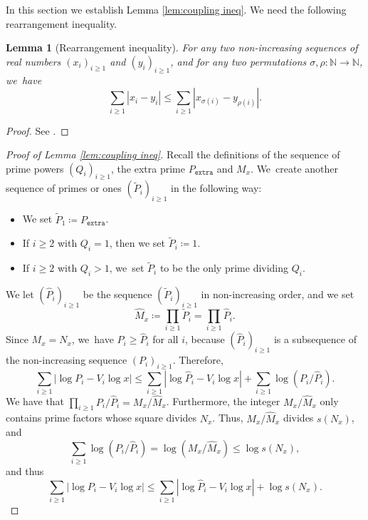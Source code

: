 \documentclass[JEP,XML,SOM,Unicode,published]{cedram}
\newcommand{\NN}{\mathbb{N}}
\newcommand{\pextra}{P_{\mathtt{extra}}}
\theoremstyle{plain}
\newtheorem{lem}[cor]{Lemma}
\theoremstyle{definition}
\begin{document}
In this section we establish Lemma \ref{lem:coupling ineq}.
We need the following rearrangement inequality.

\begin{lem}[Rearrangement inequality]
\label{lem:rearrangement-ineq}
For any two non-increasing sequences of real numbers $(x_i)_{i \ge 1}$ and $(y_i)_{i \ge 1}$, and for any two permutations $\sigma, \rho \colon \NN \to \NN$, we~have
\[
\sum_{i \ge 1} |x_i - y_i| \le \sum_{i \ge 1} |x_{\sigma(i)} - y_{\rho(i)}|.
\]
\end{lem}

\begin{proof} See \cite[Lem.\,3.2]{ABT06}.
\end{proof}

\begin{proof}[Proof of Lemma \ref{lem:coupling ineq}]
Recall the definitions of the sequence of prime powers $(Q_i)_{i \ge 1}$, the extra prime $\pextra$ and $M_x$. We~create another sequence of primes or ones $(\tilde P_i)_{i \ge 1}$ in the following way:
\begin{itemize}
\item We set $\tilde P_1 \coloneqq \pextra$.

\item If $i \ge 2$ with $Q_i = 1$, then we set $\tilde P_i \coloneqq 1$.

\item If $i \ge 2$ with $Q_i > 1$, we~set $\tilde P_i$ to be the only prime dividing $Q_i$.
\end{itemize}
We let $(\hat P_i)_{i\ge1}$ be the sequence $(\tilde{P}_i)_{i\ge1}$ in non-increasing order, and we set
\[
\hat M_x \coloneqq \prod_{i\ge1} \tilde{P}_i = \prod_{i\ge1} \hat P_i.
\]
Since $M_x=N_x$, we~have $P_i \ge \hat P_i$ for all $i$, because $(\hat P_i)_{i \ge 1}$ is a subsequence of the non-increasing sequence $(P_i)_{i \ge 1}$. Therefore,
\[
\sum_{i \ge 1} |{\log P_i - V_i\log x}|\le \sum_{i \ge 1} |{\log \hat P_i - V_i\log x}| + \sum_{i \ge 1} \log(P_i/\hat P_i).
\]
We have that $\prod_{i \ge 1} P_i/\hat P_i = M_x/\hat M_x$. Furthermore, the integer $M_x/\hat M_x$ only contains prime factors whose square divides $N_x$. Thus, $M_x/\hat M_x$ divides $s(N_x)$, and
\begin{equation}
\label{eq:l1 dist reduction 1}
\sum_{i \ge 1} \log(P_i/\hat P_i) = \log(M_x/\hat M_x) \le \log s(N_x),
\end{equation}
and thus
\begin{equation}
\label{eq:l1 dist reduction 2}
\sum_{i \ge 1} |{\log P_i - V_i\log x}|\le \sum_{i \ge 1} |{\log \hat P_i - V_i\log x}| + \log s(N_x).
\end{equation}


\end{proof}
\end{document}
